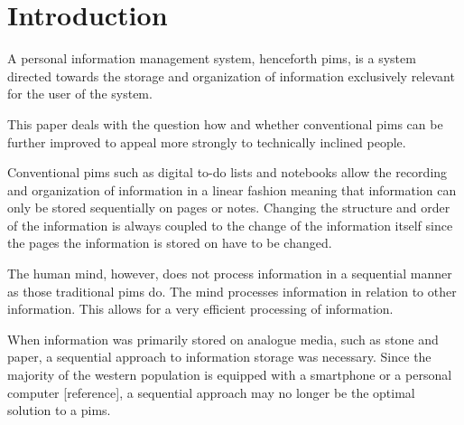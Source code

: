 \section{Introduction}

A personal information management system, henceforth \gls{pims}, is a system
directed towards the storage and organization of information exclusively
relevant for the user of the system.

This paper deals with the question how and whether conventional \gls{pims}
can be further improved to appeal more strongly to technically inclined
people.

Conventional \gls{pims} such as digital to-do lists and notebooks allow the
recording and organization of information in a linear fashion meaning that
information can only be stored sequentially on pages or notes. Changing the
structure and order of the information is always coupled to the change of the
information itself since the pages the information is stored on have to be
changed.

The human mind, however, does not process information in a sequential manner
as those traditional \gls{pims} do. \cite{Sowa:1984:CSI:4569} The mind processes information
in relation to other information. This allows for a very efficient processing
of information.

When information was primarily stored on analogue media, such as stone and
paper, a sequential approach to information storage was necessary. Since the
majority of the western population is equipped with a smartphone or a personal
computer [reference], a sequential approach may no longer be the optimal
solution to a \gls{pims}.
\iffalse
0 problem
1st problem
2nd introduction / storyline why not optimal
3rd criteria of possible solution
4rd proposition
5 conclusion / why system more optimal / research question
\fi
